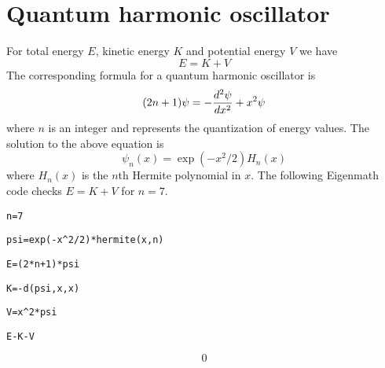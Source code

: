 \section*{Quantum harmonic oscillator}
For total energy $E$, kinetic energy $K$ and potential energy $V$ we have
$$E=K+V$$
The corresponding formula for a quantum harmonic oscillator is
$$(2n+1)\psi=-{d^2\psi\over dx^2}+x^2\psi$$
where $n$ is an integer and represents the quantization of energy values.
The solution to the above equation is
$$\psi_n(x)=\exp(-x^2/2)H_n(x)$$
where $H_n(x)$ is the $n$th Hermite polynomial in $x$.
The following Eigenmath code checks $E=K+V$ for $n=7$.

\medskip
\verb$n=7$

\verb$psi=exp(-x^2/2)*hermite(x,n)$

\verb$E=(2*n+1)*psi$

\verb$K=-d(psi,x,x)$

\verb$V=x^2*psi$

\verb$E-K-V$

$$0$$

